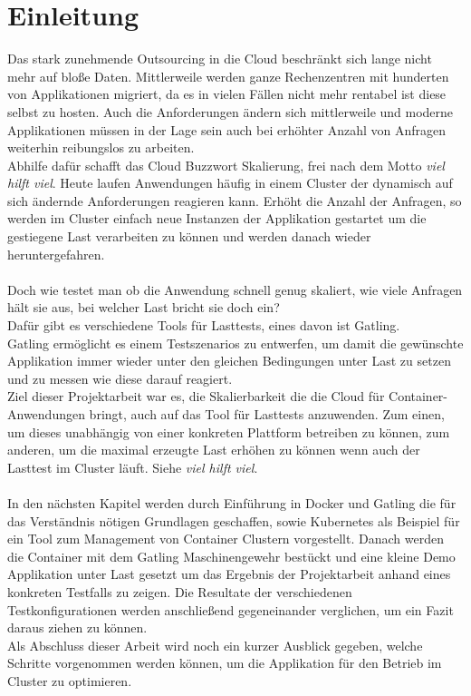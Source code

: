 \chapter{Einleitung}
Das stark zunehmende Outsourcing in die Cloud beschränkt sich lange nicht mehr auf bloße Daten. Mittlerweile werden ganze Rechenzentren mit hunderten von Applikationen migriert, da es in vielen Fällen nicht mehr rentabel ist diese selbst zu hosten.
Auch die Anforderungen ändern sich mittlerweile und moderne Applikationen müssen in der Lage sein auch bei erhöhter Anzahl von Anfragen weiterhin reibungslos zu arbeiten.\\
Abhilfe dafür schafft das Cloud Buzzwort Skalierung, frei nach dem Motto \textit{viel hilft viel}. Heute laufen Anwendungen häufig in einem Cluster der dynamisch auf sich ändernde Anforderungen reagieren kann. Erhöht die Anzahl der Anfragen, so werden im Cluster einfach neue Instanzen der Applikation gestartet um die gestiegene Last verarbeiten zu können und werden danach wieder heruntergefahren.
\\\\
Doch wie testet man ob die Anwendung schnell genug skaliert, wie viele Anfragen hält sie aus, bei welcher Last bricht sie doch ein?\\
Dafür gibt es verschiedene Tools für Lasttests, eines davon ist Gatling.\\
Gatling ermöglicht es einem Testszenarios zu entwerfen, um damit die gewünschte Applikation immer wieder unter den gleichen Bedingungen unter Last zu setzen und zu messen wie diese darauf reagiert.\\
Ziel dieser Projektarbeit war es, die Skalierbarkeit die die Cloud für Container-Anwendungen bringt, auch auf das Tool für Lasttests anzuwenden. Zum einen, um dieses unabhängig von einer konkreten Plattform betreiben zu können, zum anderen, um die maximal erzeugte Last erhöhen zu können wenn auch der Lasttest im Cluster läuft. Siehe \textit{viel hilft viel}.\\\\
In den nächsten Kapitel werden durch Einführung in Docker und Gatling die für das Verständnis nötigen Grundlagen geschaffen, sowie Kubernetes als Beispiel für ein Tool zum Management von Container Clustern vorgestellt. Danach werden die Container mit dem Gatling Maschinengewehr bestückt und eine kleine Demo Applikation unter Last gesetzt um das Ergebnis der Projektarbeit anhand eines konkreten Testfalls zu zeigen. Die Resultate der verschiedenen Testkonfigurationen werden anschließend gegeneinander verglichen, um ein Fazit daraus ziehen zu können.\\
Als Abschluss dieser Arbeit wird noch ein kurzer Ausblick gegeben, welche Schritte vorgenommen werden können, um die Applikation für den Betrieb im Cluster zu optimieren.